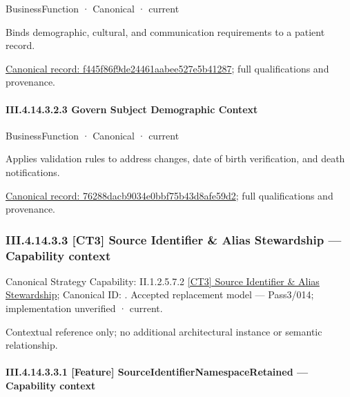 \label{element:f445f86f9de24461aabee527e5b41287}
{\small BusinessFunction · Canonical · current}\par

Binds demographic, cultural, and communication requirements to a patient record.


{\footnotesize \href{../../../../../../../../continuum/business/business-function/f445f86f9de24461aabee527e5b41287.md}{Canonical record: f445f86f9de24461aabee527e5b41287}; full qualifications and provenance.}\par
\paragraph*{III.4.14.3.2.3 Govern Subject Demographic Context}
\label{navigation:III.4.14.3.2.3}

\label{element:76288dacb9034e0bbf75b43d8afe59d2}
{\small BusinessFunction · Canonical · current}\par

Applies validation rules to address changes, date of birth verification, and death notifications.


{\footnotesize \href{../../../../../../../../continuum/business/business-function/76288dacb9034e0bbf75b43d8afe59d2.md}{Canonical record: 76288dacb9034e0bbf75b43d8afe59d2}; full qualifications and provenance.}\par
\subsubsection*{III.4.14.3.3 [CT3] Source Identifier \& Alias Stewardship — Capability context}
\label{navigation:III.4.14.3.3}

{\small Canonical Strategy Capability: II.1.2.5.7.2 \hyperref[element:d928bd4033a84a5e9fde8ec88e31bbd6]{[CT3] Source Identifier \& Alias Stewardship}; Canonical ID: \texttt{}. Accepted replacement model — Pass3/014; implementation unverified · current.}\par
Contextual reference only; no additional architectural instance or semantic relationship.\par
\paragraph*{III.4.14.3.3.1 [Feature] SourceIdentifierNamespaceRetained — Capability context}
\label{navigation:III.4.14.3.3.1}

